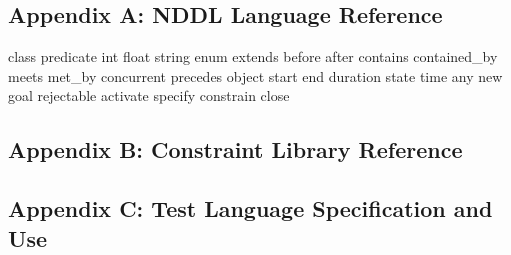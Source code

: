 \documentclass[10pt, letterpaper, twoside]{article}
\begin{document}
\subsection{Appendix A: NDDL Language Reference}
class
predicate
int
float
string
enum
extends
before
after
contains
contained_by
meets
met_by
concurrent
precedes
object
start
end
duration
state
time
any
new
goal
rejectable
activate
specify
constrain
close

\subsection{Appendix B: Constraint Library Reference}
\subsection{Appendix C: Test Language Specification and Use}
\end{document}
